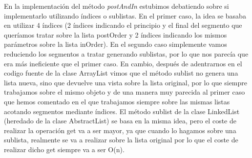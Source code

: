\documentclass{article}
\begin{document}
En la implementación del método \textit{postAndIn} estubimos debatiendo sobre si implementarlo utilizando índices o sublistas.\newline
En el primer caso, la idea se basaba en utilizar 4 índices (2 índices indicando el principio y el final del segmento que queríamos tratar sobre la lista postOrder y 2 índices indicando los mismos parámetros sobre la lista inOrder).\newline
En el segundo caso simplemente vamos reduciendo los segmentos a tratar generando sublistas, por lo que nos parecía que era más ineficiente que el primer caso.\newline
En cambio, después de adentrarnos en el codigo fuente de la clase ArrayList vimos que el método sublist no genera una lista nueva, sino que devuelve una vista sobre la lista original, por lo que siempre trabajamos sobre el mismo objeto y de una manera muy parecida al primer caso que hemos comentado en el que trabajamos siempre sobre las mismas listas acotando segmentos mediante índices.\newline
El método sublist de la clase LinkedList (heredado de la clase AbstractList) se basa en la misma idea, pero el coste de realizar la operación get va a ser mayor, ya que  cuando lo hagamos sobre una sublista, realmente se va a realizar sobre la lista original por lo que el coste de realizar dicho get siempre va a ser O(n).
\end{document}
